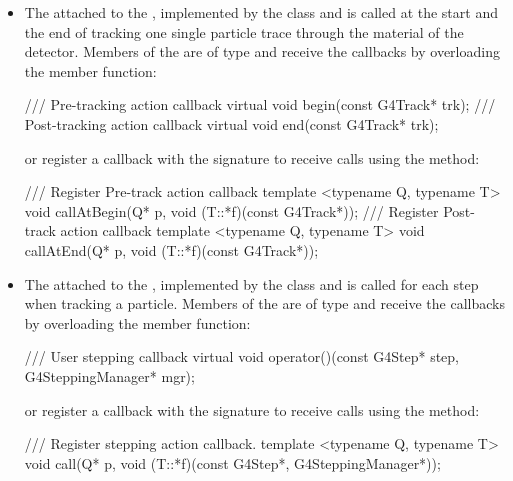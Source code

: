 \documentclass[10pt,a4paper]{article}
\begin{document}
\begin{itemize}
\item The  attached to the , 
    implemented by the   class 
    and is called at the start and the end of tracking one single particle 
    trace through the material of the detector.
    Members of the  are of type
     and receive the callbacks by overloading the member function:
\begin{unnumberedcode}
/// Pre-tracking action callback
virtual void begin(const G4Track* trk);
/// Post-tracking action callback
virtual void end(const G4Track* trk);
\end{unnumberedcode}
    or register a callback with the signature {}
    to receive calls using the method:
\begin{unnumberedcode}
/// Register Pre-track action callback
template <typename Q, typename T> void callAtBegin(Q* p, void (T::*f)(const G4Track*));
/// Register Post-track action callback
template <typename Q, typename T> void callAtEnd(Q* p, void (T::*f)(const G4Track*));
\end{unnumberedcode}


\item The  attached to the , implemented 
    by the   class and is called for each
    step when tracking a particle.
    Members of the  are of type
     and receive the callbacks by overloading the member function:
\begin{unnumberedcode}
/// User stepping callback
virtual void operator()(const G4Step* step, G4SteppingManager* mgr);
\end{unnumberedcode}
    or register a callback with the signature {}
    to receive calls using the method:
\begin{unnumberedcode}
/// Register stepping action callback.
template <typename Q, typename T> void call(Q* p, void (T::*f)(const G4Step*, 
                                                               G4SteppingManager*));
\end{unnumberedcode}



\end{itemize}
\end{document}
